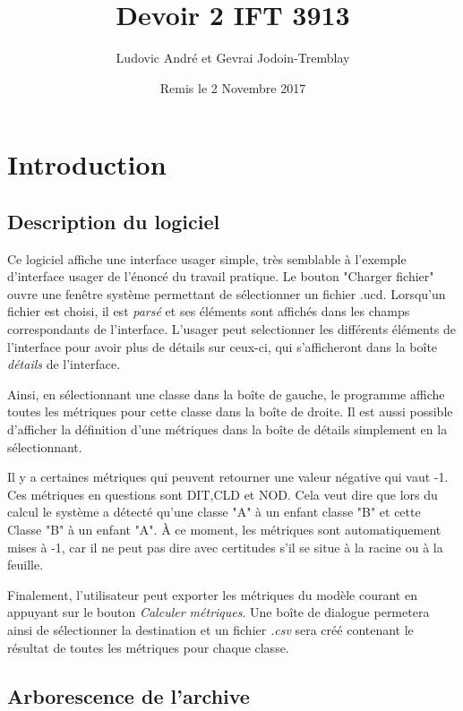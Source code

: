 \documentclass[letter,french]{report}
\begin{document}
	\title{Devoir 2 IFT 3913}
	\author{Ludovic André et Gevrai Jodoin-Tremblay}
	\date{Remis le 2 Novembre 2017}
	\maketitle
	
	
  \section*{Introduction}

	\subsection*{Description du logiciel}
	Ce logiciel affiche une interface usager simple, très semblable
	à l'exemple d'interface usager de l'énoncé du travail pratique. Le bouton "Charger
	fichier" ouvre une fenêtre système permettant de sélectionner un fichier .ucd.
	Lorsqu'un fichier est choisi, il est \emph{parsé} et ses éléments sont affichés dans
	les champs correspondants de l'interface. L'usager peut selectionner les
  différents éléments de l'interface pour avoir plus de détails sur ceux-ci, qui
  s'afficheront dans la boîte \emph{détails} de l'interface.

  Ainsi, en sélectionnant une classe dans la boîte de gauche, le programme
  affiche toutes les métriques pour cette classe dans la boîte de droite. Il est
  aussi possible d'afficher la définition d'une métriques dans la boîte de
  détails simplement en la sélectionnant.
  
  Il y a certaines métriques qui peuvent retourner une valeur négative qui vaut
  -1. Ces métriques en questions sont DIT,CLD et NOD. Cela veut dire que lors du
  calcul le système a détecté qu'une classe "A" à un enfant classe "B" et cette
  Classe "B" à un enfant "A". À ce moment, les métriques sont automatiquement
  mises à -1, car il ne peut pas dire avec certitudes s’il se situe à la racine
  ou à la feuille.

  Finalement, l'utilisateur peut exporter les métriques du modèle courant en
  appuyant sur le bouton \emph{Calculer métriques}. Une boîte de dialogue
  permetera ainsi de sélectionner la destination et un fichier \emph{.csv} sera
  créé contenant le résultat de toutes les métriques pour chaque classe.

  \subsection*{Arborescence de l'archive}
\end{document}
